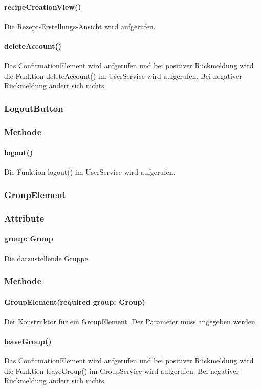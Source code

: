 \documentclass{entwurfsheft}
\begin{document}
\paragraph*{recipeCreationView()} Die Rezept-Erstellungs-Ansicht wird aufgerufen.
\paragraph*{deleteAccount()} Das ConfirmationElement wird aufgerufen und bei positiver Rückmeldung wird die Funktion deleteAccount() im UserService wird aufgerufen. Bei negativer Rückmeldung ändert sich nichts.

\subsubsection{LogoutButton}\label{sec:LogoutButton}
\subsubsection*{Methode}
\paragraph*{logout()} Die Funktion logout() im UserService wird aufgerufen.

\subsubsection*{GroupElement}\label{sec:GroupElement}
\subsubsection*{Attribute}
\paragraph*{group: Group} Die darzustellende Gruppe.

\subsubsection*{Methode}
\paragraph*{GroupElement(required group: Group)} Der Konstruktor für ein GroupElement. Der Parameter muss angegeben werden.
\paragraph*{leaveGroup()} Das ConfirmationElement wird aufgerufen und bei positiver Rückmeldung wird die Funktion leaveGroup() im GroupService wird aufgerufen. Bei negativer Rückmeldung ändert sich nichts.
\end{document}
